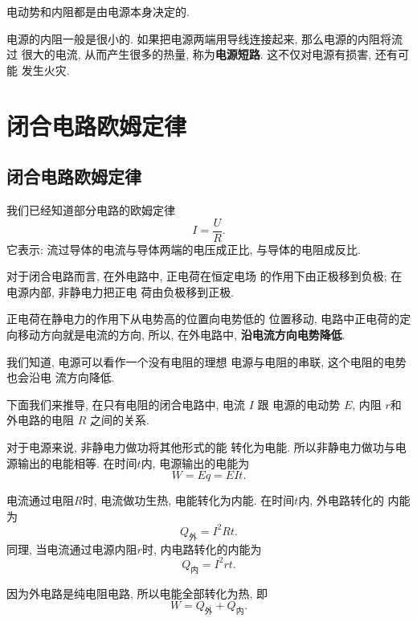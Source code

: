 \documentclass[11pt,a4paper]{ctexbook}
\begin{document}
电动势和内阻都是由电源本身决定的.

电源的内阻一般是很小的. 如果把电源两端用导线连接起来, 那么电源的内阻将流过
很大的电流, 从而产生很多的热量, 称为\textbf{电源短路}. 这不仅对电源有损害, 还有可能
发生火灾.

\section{闭合电路欧姆定律}

\subsection{闭合电路欧姆定律}

我们已经知道部分电路的欧姆定律$$I = \frac{U}{R}.$$
它表示: 流过导体的电流与导体两端的电压成正比, 与导体的电阻成反比.

对于闭合电路而言, 在外电路中, 正电荷在恒定电场
的作用下由正极移到负极; 在电源内部, 非静电力把正电
荷由负极移到正极.

正电荷在静电力的作用下从电势高的位置向电势低的
位置移动, 电路中正电荷的定向移动方向就是电流的方向,
所以, 在外电路中, \textbf{沿电流方向电势降低}.

我们知道, 电源可以看作一个没有电阻的理想
电源与电阻的串联, 这个电阻的电势也会沿电
流方向降低.

下面我们来推导, 在只有电阻的闭合电路中, 电流 $I$ 跟
电源的电动势 $E$, 内阻 $r$和外电路的电阻 $R$ 之间的关系.

对于电源来说, 非静电力做功将其他形式的能
转化为电能. 所以非静电力做功与电源输出的电能相等.
在时间$t$内, 电源输出的电能为
\begin{equation}
    W = Eq = EIt.
    \label{欧姆定律推导1}
\end{equation}

电流通过电阻$R$时, 电流做功生热, 电能转化为内能. 在时间$t$内, 外电路转化的
内能为
\begin{equation}
    Q_\text{外} = I^2Rt.
    \label{欧姆定律推导2}
\end{equation}
同理, 当电流通过电源内阻$r$时, 内电路转化的内能为
\begin{equation}
    Q_\text{内} = I^2rt.
    \label{欧姆定律推导3}
\end{equation}

因为外电路是纯电阻电路, 所以电能全部转化为热, 即
\begin{equation}
    W = Q_\text{外}+Q_\text{内}.
    \label{欧姆定律推导4}
\end{equation}
\end{document}
